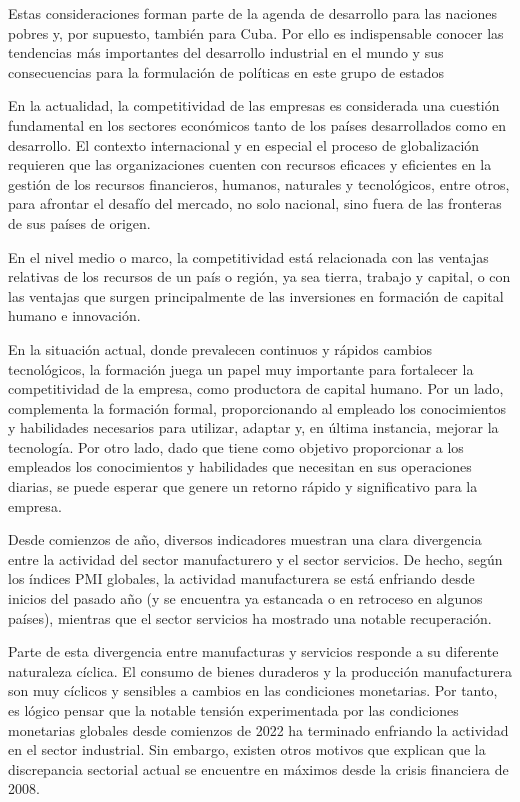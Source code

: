 Estas consideraciones forman parte de la agenda de desarrollo para las naciones pobres y, por supuesto, también para Cuba. Por ello es indispensable conocer las tendencias más importantes del desarrollo industrial en el mundo y sus consecuencias para la formulación de políticas en este grupo de estados

    En la actualidad, la competitividad de las empresas es considerada una cuestión fundamental en los sectores económicos tanto de los países desarrollados como en desarrollo. El contexto internacional y en especial el proceso de globalización requieren que las organizaciones cuenten con recursos eficaces y eficientes en la gestión de los recursos financieros, humanos, naturales y tecnológicos, entre otros, para afrontar el desafío del mercado, no solo nacional, sino fuera de las fronteras de sus países de origen. \cite{labarca2007consideraciones}
    
    En el nivel medio o marco, la competitividad está relacionada con las ventajas relativas de los recursos de un país o región, ya sea tierra, trabajo y capital, o con las ventajas que surgen principalmente de las inversiones en formación de capital humano e innovación. \cite{padilla2006instrumento}
    
    En la situación actual, donde prevalecen continuos y rápidos cambios tecnológicos, la formación juega un papel muy importante para fortalecer la competitividad de la empresa, como productora de capital humano. Por un lado, complementa la formación formal, proporcionando al empleado los conocimientos y habilidades necesarios para utilizar, adaptar y, en última instancia, mejorar la tecnología. Por otro lado, dado que tiene como objetivo proporcionar a los empleados los conocimientos y habilidades que necesitan en sus operaciones diarias, se puede esperar que genere un retorno rápido y significativo para la empresa.\cite{casar1993competitividad}
    
    Desde comienzos de año, diversos indicadores muestran una clara divergencia entre la actividad del sector manufacturero y el sector servicios. De hecho, según los índices PMI globales, la actividad manufacturera se está enfriando desde inicios del pasado año (y se encuentra ya estancada o en retroceso en algunos países), mientras que el sector servicios ha mostrado una notable recuperación.
    
    Parte de esta divergencia entre manufacturas y servicios responde a su diferente naturaleza cíclica. El consumo de bienes duraderos y la producción manufacturera son muy cíclicos y sensibles a cambios en las condiciones monetarias. Por tanto, es lógico pensar que la notable tensión experimentada por las condiciones monetarias globales desde comienzos de 2022 ha terminado enfriando la actividad en el sector industrial. Sin embargo, existen otros motivos que explican que la discrepancia sectorial actual se encuentre en máximos desde la crisis financiera de 2008. \cite{CaixaBank}
    
